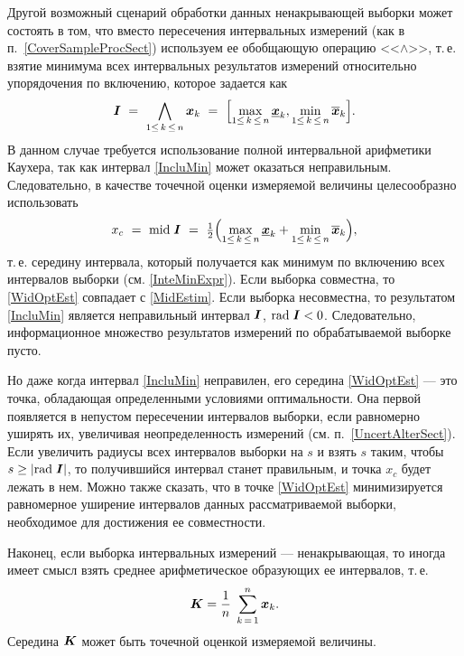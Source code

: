 \documentclass[a5paper,openany]{book}
\newcommand{\mbf}[1]{\protect\text{\boldmath$#1$}}
\newcommand{\ov}{\overline}
\newcommand{\un}{\underline}
\newcommand{\m}{\mathrm{mid}\;}
\renewcommand{\r}{\mathrm{rad}\;}
\begin{document}
Другой возможный сценарий обработки данных ненакрывающей выборки может состоять в том, 
что вместо пересечения интервальных измерений (как в п.~\ref{CoverSampleProcSect}) 
используем ее обобщающую операцию <<$\wedge$>>, т.\,е. взятие минимума всех 
интервальных результатов измерений относительно упорядочения по включению, которое 
задается как %
\begin{equation}
\label{IncluMin} 
\mbf{I} \  = \   
\bigwedge_{1 \leq \,k\,\leq \,n} \mbf{x}_{k} \   = \  
\Bigl[\max_{1 \leq \, k \, \leq \, n} \un{\mbf{x}}_{k}, 
\min_{1  \leq \, k \, \leq \, n} \ov{\mbf{x}}_{k}\Bigr].  
\end{equation} 
В данном случае требуется использование полной интервальной арифметики Каухера, 
так как интервал \eqref{IncluMin} может оказаться неправильным. Следовательно, 
в качестве точечной оценки измеряемой величины целесообразно использовать 
\begin{equation}
\label{WidOptEst} 
x_c \  = \  \m\mbf{I} \  
= \  \tfrac{1}{2}\Bigl(\max_{1\leq \, k \,\leq \,n} \un{\mbf{x}}_{k} 
+ \min_{1\leq \, k\,\leq \, n} \ov{\mbf{x}}_{k} \Bigr), 
\end{equation} 
т.\,е. середину интервала, который получается как минимум по включению всех интервалов 
выборки (см. \eqref{InteMinExpr}). Если выборка совместна, то \eqref{WidOptEst} совпадает 
с \eqref{MidEstim}. Если выборка несовместна, то результатом \eqref{IncluMin} является 
неправильный интервал $\mbf{I}$, $\r\mbf{I} < 0$. Следовательно, информационное множество 
результатов измерений по обрабатываемой выборке пусто. 

Но даже когда интервал \eqref{IncluMin} неправилен, его середина \eqref{WidOptEst} 
--- это точка, обладающая определенными условиями оптимальности. Она первой появляется 
в непустом пересечении интервалов выборки, если  равномерно уширять их, 
увеличивая неопределенность измерений (см. п.~\ref{UncertAlterSect}). 
Если увеличить радиусы всех интервалов выборки на $s$ и
взять $s$ таким, чтобы $s\geq|\r\mbf{I}|$, то получившийся интервал станет правильным, 
и точка $x_c$ будет лежать в нем. Можно также сказать, что в точке \eqref{WidOptEst} 
минимизируется равномерное уширение интервалов данных рассматриваемой выборки, 
необходимое для достижения ее совместности. 

Наконец, если выборка интервальных измерений --- ненакрывающая, то иногда имеет смысл 
взять среднее арифметическое образующих ее интервалов, т.\,е. 
\begin{equation*} 
\mbf{K} = \frac{1}{n}\;\sum_{k \,= \,1}^n \mbf{x}_k . 
\end{equation*} 
Середина $\mbf{K}$ может быть точечной оценкой измеряемой величины. 
\end{document}
